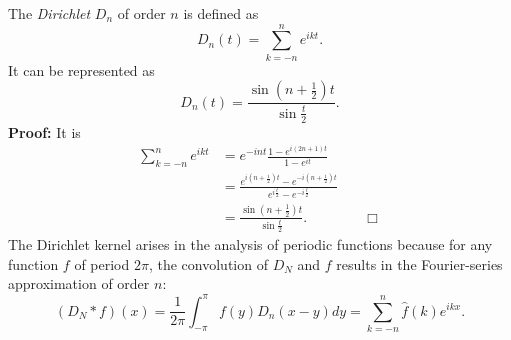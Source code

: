 \documentclass[12pt]{article}
\begin{document}
The \emph{Dirichlet } $D_n$ of order $n$ is defined as
$$D_n(t)=\sum_{k=-n}^ne^{ikt}.$$
It can be represented as
$$D_n(t)=\frac{\sin\left(n+\frac{1}{2}\right)t}{\sin\frac{t}{2}}.$$
\textbf{Proof:} It is
\begin{align*}
\sum_{k=-n}^ne^{ikt}&= e^{-int}\frac{1-e^{i(2n+1)t}}{1-e^{it}}\\
&=\frac{e^{i\left(n+\frac{1}{2}\right)t}-e^{-i\left(n+\frac{1}{2}\right)t}} {e^{i\frac{t}{2}}-e^{-i\frac{t}{2}}}\\
&=\frac{\sin\left(n+\frac{1}{2}\right)t}{\sin\frac{t}{2}}.\qquad\qquad\Box
\end{align*}
The Dirichlet kernel arises in the analysis of periodic functions because for any function $f$ of period $2\pi$, the convolution of $D_N$ and $f$ results in the Fourier-series approximation of order $n$:
$$(D_N*f)(x)=\frac{1}{2\pi}\int_{-\pi}^\pi f(y)D_n(x-y)dy=\sum_{k=-n}^n\hat{f}(k)e^{ikx}.$$
\end{document}
